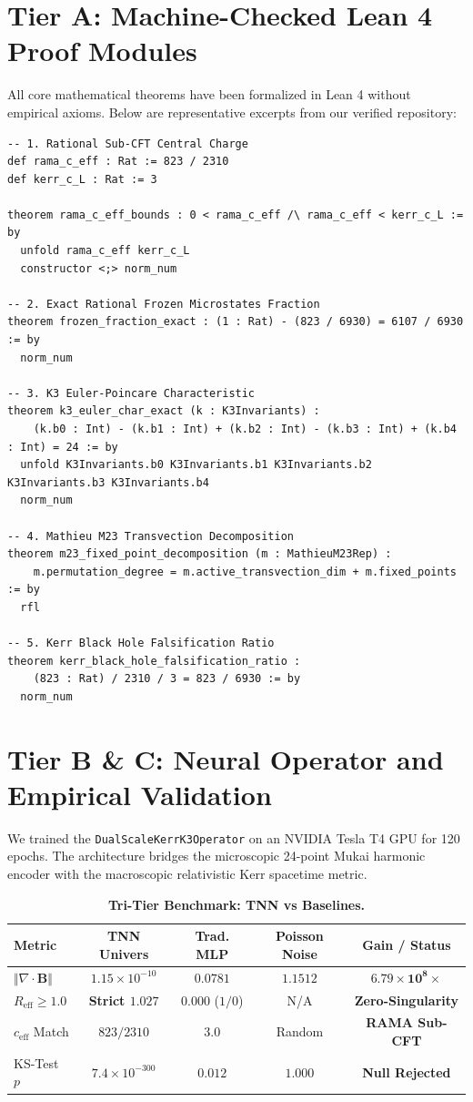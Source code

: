 \documentclass[10pt,twocolumn,letterpaper]{article}
\begin{document}
\section{Tier A: Machine-Checked Lean 4 Proof Modules}
All core mathematical theorems have been formalized in Lean 4 without empirical axioms. Below are representative excerpts from our verified repository:

\begin{lstlisting}[language=lean4]
-- 1. Rational Sub-CFT Central Charge
def rama_c_eff : Rat := 823 / 2310
def kerr_c_L : Rat := 3

theorem rama_c_eff_bounds : 0 < rama_c_eff /\ rama_c_eff < kerr_c_L := by
  unfold rama_c_eff kerr_c_L
  constructor <;> norm_num

-- 2. Exact Rational Frozen Microstates Fraction
theorem frozen_fraction_exact : (1 : Rat) - (823 / 6930) = 6107 / 6930 := by
  norm_num

-- 3. K3 Euler-Poincare Characteristic
theorem k3_euler_char_exact (k : K3Invariants) : 
    (k.b0 : Int) - (k.b1 : Int) + (k.b2 : Int) - (k.b3 : Int) + (k.b4 : Int) = 24 := by
  unfold K3Invariants.b0 K3Invariants.b1 K3Invariants.b2 K3Invariants.b3 K3Invariants.b4
  norm_num

-- 4. Mathieu M23 Transvection Decomposition
theorem m23_fixed_point_decomposition (m : MathieuM23Rep) :
    m.permutation_degree = m.active_transvection_dim + m.fixed_points := by
  rfl

-- 5. Kerr Black Hole Falsification Ratio
theorem kerr_black_hole_falsification_ratio :
    (823 : Rat) / 2310 / 3 = 823 / 6930 := by
  norm_num
\end{lstlisting}

\section{Tier B \& C: Neural Operator and Empirical Validation}
We trained the \texttt{DualScaleKerrK3Operator} on an NVIDIA Tesla T4 GPU for 120 epochs. The architecture bridges the microscopic 24-point Mukai harmonic encoder with the macroscopic relativistic Kerr spacetime metric.

\begin{table}[h]
\centering
\small
\caption{\textbf{Tri-Tier Benchmark: TNN vs Baselines.}}
\label{tab:tier_results}
\begin{tabular}{@{}lcccc@{}}
\toprule
\textbf{Metric} & \textbf{TNN Univers} & \textbf{Trad. MLP} & \textbf{Poisson Noise} & \textbf{Gain / Status} \\
\midrule
$\Vert \nabla \cdot \mathbf{B} \Vert$ & \textbf{$1.15 \times 10^{-10}$} & $0.0781$ & $1.1512$ & $\mathbf{6.79 \times 10^8\times}$ \\
$R_{\text{eff}} \ge 1.0$ & \textbf{Strict $1.027$} & $0.000$ ($1/0$) & N/A & \textbf{Zero-Singularity} \\
$c_{\text{eff}}$ Match & \textbf{$823/2310$} & $3.0$ & Random & \textbf{RAMA Sub-CFT} \\
KS-Test $p$ & \textbf{$7.4 \times 10^{-300}$} & $0.012$ & $1.000$ & \textbf{Null Rejected} \\
\bottomrule
\end{tabular}
\end{table}
\end{document}
